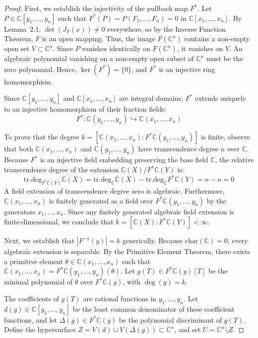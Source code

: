 \documentclass[11pt,reqno]{amsart}
\theoremstyle{definition}
\begin{document}
\begin{proof}
First, we establish the injectivity of the pullback map $F^*$. Let $P \in \mathbb{C}[y_1, \dots, y_n]$ such that $F^*(P) = P(F_1, \dots, F_n) = 0$ in $\mathbb{C}[x_1, \dots, x_n]$. By Lemma~2.1, $\det(J_F(x)) \neq 0$ everywhere, so by the Inverse Function Theorem, $F$ is an open mapping. Thus, the image $F(\mathbb{C}^n)$ contains a non-empty open set $V \subset \mathbb{C}^n$. Since $P$ vanishes identically on $F(\mathbb{C}^n)$, it vanishes on $V$. An algebraic polynomial vanishing on a non-empty open subset of $\mathbb{C}^n$ must be the zero polynomial. Hence, $\ker(F^*) = \{0\}$, and $F^*$ is an injective ring homomorphism.

Since $\mathbb{C}[y_1, \dots, y_n]$ and $\mathbb{C}[x_1, \dots, x_n]$ are integral domains, $F^*$ extends uniquely to an injective homomorphism of their fraction fields:
$$F^*: \mathbb{C}(y_1, \dots, y_n) \hookrightarrow \mathbb{C}(x_1, \dots, x_n)$$

To prove that the degree $k = [\mathbb{C}(x_1, \dots, x_n) : F^*\mathbb{C}(y_1, \dots, y_n)]$ is finite, observe that both $\mathbb{C}(x_1, \dots, x_n)$ and $\mathbb{C}(y_1, \dots, y_n)$ have transcendence degree $n$ over $\mathbb{C}$. Because $F^*$ is an injective field embedding preserving the base field $\mathbb{C}$, the relative transcendence degree of the extension $\mathbb{C}(X) / F^*\mathbb{C}(Y)$ is:
$$\mathrm{tr.deg}_{F^*\mathbb{C}(Y)} \mathbb{C}(X) = \mathrm{tr.deg}_{\mathbb{C}} \mathbb{C}(X) - \mathrm{tr.deg}_{\mathbb{C}} F^*\mathbb{C}(Y) = n - n = 0$$
A field extension of transcendence degree zero is algebraic. Furthermore, $\mathbb{C}(x_1, \dots, x_n)$ is finitely generated as a field over $F^*\mathbb{C}(y_1, \dots, y_n)$ by the generators $x_1, \dots, x_n$. Since any finitely generated algebraic field extension is finite-dimensional, we conclude that $k = [\mathbb{C}(X) : F^*\mathbb{C}(Y)] < \infty$.

Next, we establish that $|F^{-1}(y)| = k$ generically. Because $\mathrm{char}(\mathbb{C}) = 0$, every algebraic extension is separable. By the Primitive Element Theorem, there exists a primitive element $\theta \in \mathbb{C}(x_1, \dots, x_n)$ such that $\mathbb{C}(x_1, \dots, x_n) = F^*\mathbb{C}(y_1, \dots, y_n)(\theta)$. Let $g(T) \in F^*\mathbb{C}(y)[T]$ be the minimal polynomial of $\theta$ over $F^*\mathbb{C}(y)$, with $\deg(g) = k$.

The coefficients of $g(T)$ are rational functions in $y_1, \dots, y_n$. Let $d(y) \in \mathbb{C}[y_1, \dots, y_n]$ be the least common denominator of these coefficient functions, and let $\Delta(g) \in F^*\mathbb{C}(y)$ be the polynomial discriminant of $g(T)$. Define the hypersurface $Z = V(d) \cup V(\Delta(g)) \subset \mathbb{C}^n$, and set $U = \mathbb{C}^n \setminus Z$. 


\end{proof}
\end{document}
